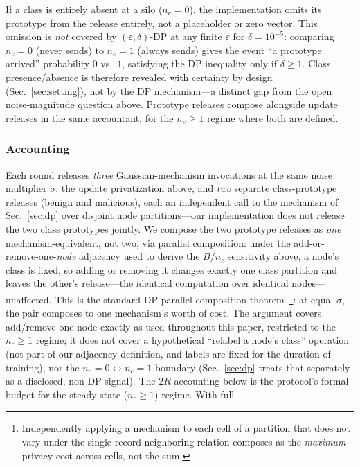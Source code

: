 \documentclass[journal]{IEEEtran}
\newcommand{\eps}{\varepsilon}
\begin{document}
If a class is entirely absent at a silo ($n_c{=}0$), the
implementation omits its prototype from the release entirely, not a
placeholder or zero vector. This omission is \emph{not} covered by
$(\eps,\delta)$-DP at any finite $\eps$ for $\delta{=}10^{-5}$:
comparing $n_c{=}0$ (never sends) to $n_c{=}1$ (always sends) gives the
event ``a prototype arrived'' probability $0$ vs.\ $1$, satisfying the
DP inequality only if $\delta \ge 1$. Class presence/absence is
therefore revealed with certainty by design (Sec.~\ref{sec:setting}),
not by the DP mechanism---a distinct gap from the open noise-magnitude
question above. Prototype releases compose alongside update releases
in the same accountant, for the $n_c \ge 1$ regime where both are
defined.

\subsubsection{Accounting}
\label{sec:dpaccounting}
Each round releases \emph{three} Gaussian-mechanism invocations at the
same noise multiplier $\sigma$: the update privatization above, and
\emph{two} separate class-prototype releases (benign and malicious),
each an independent call to the mechanism of Sec.~\ref{sec:dp} over
disjoint node partitions---our implementation does not release the two
class prototypes jointly. We compose the two prototype releases as
\emph{one} mechanism-equivalent, not two, via parallel composition:
under the add-or-remove-one-\emph{node} adjacency used to derive the
$B/n_c$ sensitivity above, a node's class is fixed, so adding or
removing it changes exactly one class partition and leaves the
other's release---the identical computation over identical
nodes---unaffected. This is the standard DP parallel composition
theorem~\cite{pinq}\footnote{Independently applying a mechanism to
each cell of a partition that does not vary under the single-record
neighboring relation composes as the \emph{maximum} privacy cost
across cells, not the sum.}: at equal $\sigma$, the pair composes to
one mechanism's worth of cost. The argument covers add/remove-one-node
exactly as used throughout this paper, restricted to the $n_c \ge 1$
regime; it does not cover a hypothetical ``relabel a node's class''
operation (not part of our adjacency definition, and labels are fixed
for the duration of training), nor the $n_c{=}0 \leftrightarrow n_c{=}1$
boundary (Sec.~\ref{sec:dp} treats that separately as a disclosed,
non-DP signal). The $2R$ accounting below is the protocol's formal
budget for the steady-state ($n_c \ge 1$) regime. With full
\end{document}
